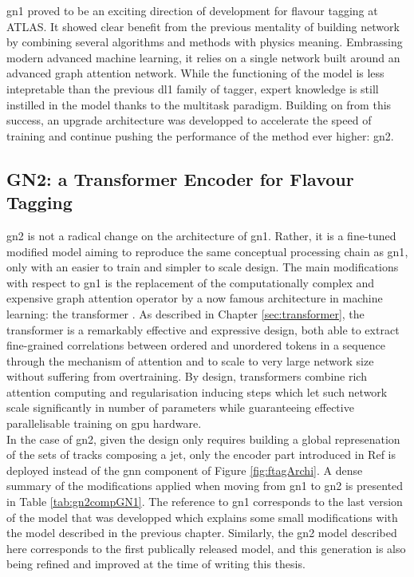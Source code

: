 \gls{gn1} proved to be an exciting direction of development for flavour tagging at ATLAS. It showed clear benefit from the previous mentality of building network by combining several algorithms and methods with physics meaning. Embrassing modern advanced machine learning, it relies on a single network built around an advanced graph attention network. While the functioning of the model is less intepretable than the previous \gls{dl1} family of tagger, expert knowledge is still instilled in the model thanks to the multitask paradigm. Building on from this success, an upgrade architecture was developped to accelerate the speed of training and continue pushing the performance of the method ever higher: \gls{gn2}.

\subsection{GN2: a Transformer Encoder for Flavour Tagging}\label{chap-GN2}
\gls{gn2} is not a radical change on the architecture of \gls{gn1}. Rather, it is a fine-tuned modified model aiming to reproduce the same conceptual processing chain as \gls{gn1}, only with an easier to train and simpler to scale design. The main modifications with respect to \gls{gn1} is the replacement of the computationally complex and expensive graph attention operator by a now famous architecture in machine learning: the transformer \cite{NIPS_transformerPaper}. As described in Chapter \ref{sec:transformer}, the transformer is a remarkably effective and expressive design, both able to extract fine-grained correlations between ordered and unordered tokens in a sequence through the mechanism of attention and to scale to very large network size without suffering from overtraining. By design, transformers combine rich attention computing and regularisation inducing steps which let such network scale significantly in number of parameters while guaranteeing effective parallelisable training on \gls{gpu} hardware. \\

In the case of \gls{gn2}, given the design only requires building a global represenation of the sets of tracks composing a jet, only the encoder part introduced in Ref \cite{NIPS_transformerPaper} is deployed instead of the \gls{gnn} component of Figure \ref{fig:ftagArchi}. A dense summary of the modifications applied when moving from \gls{gn1} to \gls{gn2} is presented in Table \ref{tab:gn2compGN1}. The reference to \gls{gn1} corresponds to the last version of the model that was developped which explains some small modifications with the model described in the previous chapter. Similarly, the \gls{gn2} model described here corresponds to the first publically released model, and this generation is also being refined and improved at the time of writing this thesis. 

